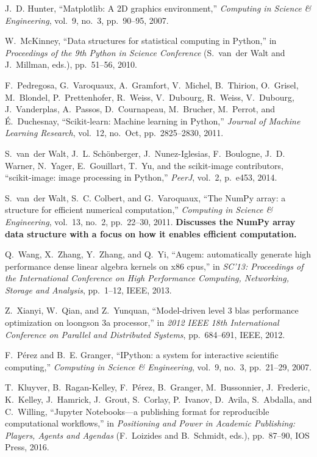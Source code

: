 \documentclass[twocolumn]{article}
\begin{document}
\begin{thebibliography}{10}
J.~D. Hunter, ``Matplotlib: A {2D} graphics environment,'' {\em Computing in
  Science \& Engineering}, vol.~9, no.~3, pp.~90--95, 2007.

W.~McKinney, ``Data structures for statistical computing in {Python},'' in {\em
  Proceedings of the 9th Python in Science Conference} (S.~van~der Walt and
  J.~Millman, eds.), pp.~51--56, 2010.

F.~Pedregosa, G.~Varoquaux, A.~Gramfort, V.~Michel, B.~Thirion, O.~Grisel,
  M.~Blondel, P.~Prettenhofer, R.~Weiss, V.~Dubourg, R.~Weiss, V.~Dubourg,
  J.~Vanderplas, A.~Passos, D.~Cournapeau, M.~Brucher, M.~Perrot, and
  {\'E}.~Duchesnay, ``Scikit-learn: Machine learning in {P}ython,'' {\em
  Journal of Machine Learning Research}, vol.~12, no.~Oct, pp.~2825--2830,
  2011.

S.~van~der Walt, J.~L. Sch{\"o}nberger, J.~Nunez-Iglesias, F.~Boulogne, J.~D.
  Warner, N.~Yager, E.~Gouillart, T.~Yu, and {the scikit-image contributors},
  ``{scikit-image}: image processing in {P}ython,'' {\em PeerJ}, vol.~2,
  p.~e453, 2014.

S.~van~der Walt, S.~C. Colbert, and G.~Varoquaux, ``The {NumPy} array: a
  structure for efficient numerical computation,'' {\em Computing in Science \&
  Engineering}, vol.~13, no.~2, pp.~22--30, 2011.
\newblock \newline \textbf{Discusses the NumPy array data structure with a
  focus on how it enables efficient computation.}

Q.~Wang, X.~Zhang, Y.~Zhang, and Q.~Yi, ``Augem: automatically generate high
  performance dense linear algebra kernels on x86 cpus,'' in {\em SC'13:
  Proceedings of the International Conference on High Performance Computing,
  Networking, Storage and Analysis}, pp.~1--12, IEEE, 2013.

Z.~Xianyi, W.~Qian, and Z.~Yunquan, ``Model-driven level 3 blas performance
  optimization on loongson 3a processor,'' in {\em 2012 IEEE 18th International
  Conference on Parallel and Distributed Systems}, pp.~684--691, IEEE, 2012.

F.~P{\'e}rez and B.~E. Granger, ``{IP}ython: a system for interactive
  scientific computing,'' {\em Computing in Science \& Engineering}, vol.~9,
  no.~3, pp.~21--29, 2007.

T.~Kluyver, B.~Ragan-Kelley, F.~P{\'e}rez, B.~Granger, M.~Bussonnier,
  J.~Frederic, K.~Kelley, J.~Hamrick, J.~Grout, S.~Corlay, P.~Ivanov, D.~Avila,
  S.~Abdalla, and C.~Willing, ``{Jupyter Notebooks}---a publishing format for
  reproducible computational workflows,'' in {\em Positioning and Power in
  Academic Publishing: Players, Agents and Agendas} (F.~Loizides and
  B.~Schmidt, eds.), pp.~87--90, IOS Press, 2016.


\end{thebibliography}
\end{document}
